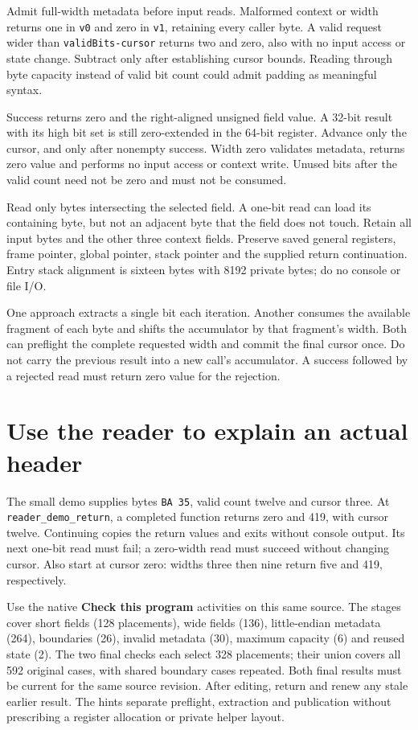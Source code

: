 Admit full-width metadata before input reads. Malformed context or width returns
one in \texttt{v0} and zero in \texttt{v1}, retaining every caller byte. A valid
request wider than \texttt{validBits-cursor} returns two and zero, also with no
input access or state change. Subtract only after establishing cursor bounds.
Reading through byte capacity instead of valid bit count could admit padding
as meaningful syntax.

Success returns zero and the right-aligned unsigned field value. A 32-bit result
with its high bit set is still zero-extended in the 64-bit register. Advance only
the cursor, and only after nonempty success. Width zero validates metadata,
returns zero value and performs no input access or context write. Unused bits
after the valid count need not be zero and must not be consumed.

Read only bytes intersecting the selected field. A one-bit read can load its
containing byte, but not an adjacent byte that the field does not touch. Retain
all input bytes and the other three context fields. Preserve saved general
registers, frame pointer, global pointer, stack pointer and the supplied return
continuation. Entry stack alignment is sixteen bytes with 8192 private bytes;
do no console or file I/O.

One approach extracts a single bit each iteration. Another consumes the available
fragment of each byte and shifts the accumulator by that fragment's width.
Both can preflight the complete requested width and commit the final cursor once.
Do not carry the previous result into a new call's accumulator. A success followed
by a rejected read must return zero value for the rejection.

\section{Use the reader to explain an actual header}

The small demo supplies bytes \texttt{BA 35}, valid count twelve and cursor three.
At \texttt{reader\_demo\_return}, a completed function returns zero and 419,
with cursor twelve. Continuing copies the return values and exits without console
output. Its next one-bit read must fail; a zero-width read must succeed without
changing cursor. Also start at cursor zero: widths three then nine return five
and 419, respectively.

Use the native \textbf{Check this program} activities on this same source.
The stages cover short fields (128 placements), wide fields (136), little-endian
metadata (264), boundaries (26), invalid metadata (30), maximum capacity (6) and
reused state (2). The two final checks each select 328 placements; their union
covers all 592 original cases, with shared boundary cases repeated. Both final
results must be current for the same source revision. After editing, return and
renew any stale earlier result. The hints separate preflight, extraction and
publication without prescribing a register allocation or private helper layout.

